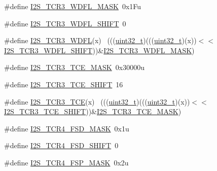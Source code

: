 \begin{DoxyCompactItemize}
\item 
\#define \hyperlink{group___i2_s___register___masks_ga49de2df89ebdb02cdb32c8a15f9ac7b4}{I2\+S\+\_\+\+T\+C\+R3\+\_\+\+W\+D\+F\+L\+\_\+\+M\+A\+SK}~0x1\+Fu
\item 
\#define \hyperlink{group___i2_s___register___masks_ga984179c79c4fc833f32c031c69a33cd9}{I2\+S\+\_\+\+T\+C\+R3\+\_\+\+W\+D\+F\+L\+\_\+\+S\+H\+I\+FT}~0
\item 
\#define \hyperlink{group___i2_s___register___masks_gae18017d62dcbde7881d963b3217d0743}{I2\+S\+\_\+\+T\+C\+R3\+\_\+\+W\+D\+FL}(x)                                              ~(((\hyperlink{_p_e___types_8h_a33594304e786b158f3fb30289278f5af}{uint32\+\_\+t})(((\hyperlink{_p_e___types_8h_a33594304e786b158f3fb30289278f5af}{uint32\+\_\+t})(x))$<$$<$\hyperlink{group___i2_s___register___masks_ga984179c79c4fc833f32c031c69a33cd9}{I2\+S\+\_\+\+T\+C\+R3\+\_\+\+W\+D\+F\+L\+\_\+\+S\+H\+I\+FT}))\&\hyperlink{group___i2_s___register___masks_ga49de2df89ebdb02cdb32c8a15f9ac7b4}{I2\+S\+\_\+\+T\+C\+R3\+\_\+\+W\+D\+F\+L\+\_\+\+M\+A\+SK})
\item 
\#define \hyperlink{group___i2_s___register___masks_ga27bcb7b4d391b96f7fd8f566579bf7e2}{I2\+S\+\_\+\+T\+C\+R3\+\_\+\+T\+C\+E\+\_\+\+M\+A\+SK}~0x30000u
\item 
\#define \hyperlink{group___i2_s___register___masks_gab6791fd5b9271db39f4f91173ed3c30d}{I2\+S\+\_\+\+T\+C\+R3\+\_\+\+T\+C\+E\+\_\+\+S\+H\+I\+FT}~16
\item 
\#define \hyperlink{group___i2_s___register___masks_gae0bab25830b011173c849e48f0f3f717}{I2\+S\+\_\+\+T\+C\+R3\+\_\+\+T\+CE}(x)                                                ~(((\hyperlink{_p_e___types_8h_a33594304e786b158f3fb30289278f5af}{uint32\+\_\+t})(((\hyperlink{_p_e___types_8h_a33594304e786b158f3fb30289278f5af}{uint32\+\_\+t})(x))$<$$<$\hyperlink{group___i2_s___register___masks_gab6791fd5b9271db39f4f91173ed3c30d}{I2\+S\+\_\+\+T\+C\+R3\+\_\+\+T\+C\+E\+\_\+\+S\+H\+I\+FT}))\&\hyperlink{group___i2_s___register___masks_ga27bcb7b4d391b96f7fd8f566579bf7e2}{I2\+S\+\_\+\+T\+C\+R3\+\_\+\+T\+C\+E\+\_\+\+M\+A\+SK})
\item 
\#define \hyperlink{group___i2_s___register___masks_ga895aea8d5cc09529dfca99dc5c511644}{I2\+S\+\_\+\+T\+C\+R4\+\_\+\+F\+S\+D\+\_\+\+M\+A\+SK}~0x1u
\item 
\#define \hyperlink{group___i2_s___register___masks_ga61e4999938fd48b7f2f316e1563277ec}{I2\+S\+\_\+\+T\+C\+R4\+\_\+\+F\+S\+D\+\_\+\+S\+H\+I\+FT}~0
\item 
\#define \hyperlink{group___i2_s___register___masks_ga040aed413399e30e47219d040ff46c9d}{I2\+S\+\_\+\+T\+C\+R4\+\_\+\+F\+S\+P\+\_\+\+M\+A\+SK}~0x2u

\end{DoxyCompactItemize}
